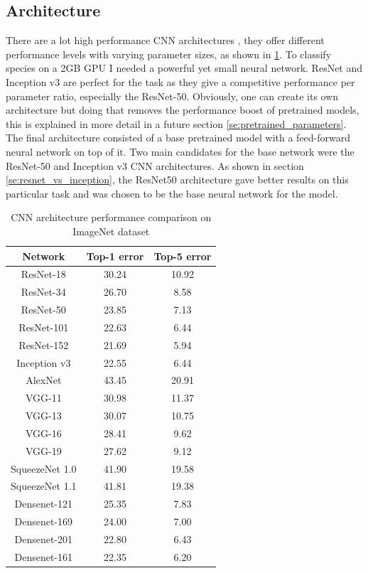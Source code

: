 \documentclass[times, utf8, diplomski]{fer}
\begin{document}
\subsection{Architecture}
\label{se:architecture}

There are a lot high performance CNN architectures \citep{he_deep_2016, simonyan_very_2014, szegedy_going_2015}, they offer different performance levels with varying parameter sizes, as shown in \ref{tb:CNN_architecutre_performance}. To classify species on a 2GB GPU I needed a powerful yet small neural network. ResNet and Inception v3 are perfect for the task as they give a competitive performance per parameter ratio, especially the ResNet-50. Obviously, one can create its own architecture but doing that removes the performance boost of pretrained models, this is explained in more detail in a future section \ref{se:pretrained_parameters}. The final architecture consisted of a base pretrained model with a feed-forward neural network on top of it. Two main candidates for the base network were the ResNet-50 and Inception v3 CNN architectures. As shown in section \ref{se:resnet_vs_inception}, the ResNet50 architecture gave better results on this particular task and was chosen to be the base neural network for the model.

\begin{table}
\centering
\caption{CNN architecture performance comparison on ImageNet dataset}
\label{tb:CNN_architecutre_performance}
\begin{tabular}{ccc}
\hline 
Network    & Top-1 error & Top-5 error \\  \hline
ResNet-18 & 30.24 & 10.92 \\
ResNet-34 & 26.70 & 8.58 \\ 
ResNet-50 & 23.85 & 7.13 \\ 
ResNet-101 & 22.63 & 6.44 \\ 
ResNet-152 & 21.69 & 5.94 \\  \hline
Inception v3 & 22.55 & 6.44 \\  \hline
AlexNet & 43.45 & 20.91 \\  \hline
VGG-11 & 30.98 & 11.37 \\ 
VGG-13 & 30.07 & 10.75 \\ 
VGG-16 & 28.41 & 9.62 \\ 
VGG-19 & 27.62 & 9.12 \\  \hline
SqueezeNet 1.0 & 41.90 & 19.58 \\ 
SqueezeNet 1.1 & 41.81 & 19.38 \\  \hline
Densenet-121 & 25.35 & 7.83 \\ 
Densenet-169 & 24.00 & 7.00 \\ 
Densenet-201 & 22.80 & 6.43 \\ 
Densenet-161 & 22.35 & 6.20 \\ 
\hline 
\end{tabular} 
\end{table}
\end{document}
